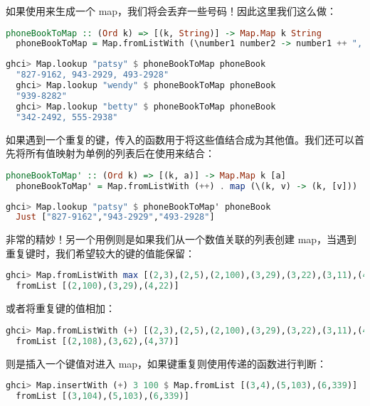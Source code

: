 \documentclass[./main.tex]{subfiles}
\begin{document}
如果使用来生成一个 map，我们将会丢弃一些号码！因此这里我们这么做：

\begin{lstlisting}[language=Haskell]
  phoneBookToMap :: (Ord k) => [(k, String)] -> Map.Map k String
  phoneBookToMap = Map.fromListWith (\number1 number2 -> number1 ++ ", " ++ number2)
\end{lstlisting}

\begin{lstlisting}[language=Haskell]
  ghci> Map.lookup "patsy" $ phoneBookToMap phoneBook
  "827-9162, 943-2929, 493-2928"
  ghci> Map.lookup "wendy" $ phoneBookToMap phoneBook
  "939-8282"
  ghci> Map.lookup "betty" $ phoneBookToMap phoneBook
  "342-2492, 555-2938"
\end{lstlisting}

如果遇到一个重复的键，传入的函数用于将这些值结合成为其他值。我们还可以首先将所有值映射为单例的列表后在使用\acode{++}来结合：

\begin{lstlisting}[language=Haskell]
  phoneBookToMap' :: (Ord k) => [(k, a)] -> Map.Map k [a]
  phoneBookToMap' = Map.fromListWith (++) . map (\(k, v) -> (k, [v]))
\end{lstlisting}

\begin{lstlisting}[language=Haskell]
  ghci> Map.lookup "patsy" $ phoneBookToMap' phoneBook
  Just ["827-9162","943-2929","493-2928"]
\end{lstlisting}

非常的精妙！另一个用例则是如果我们从一个数值关联的列表创建 map，当遇到重复键时，我们希望较大的键的值能保留：

\begin{lstlisting}[language=Haskell]
  ghci> Map.fromListWith max [(2,3),(2,5),(2,100),(3,29),(3,22),(3,11),(4,22),(4,15)]
  fromList [(2,100),(3,29),(4,22)]
\end{lstlisting}

或者将重复键的值相加：

\begin{lstlisting}[language=Haskell]
  ghci> Map.fromListWith (+) [(2,3),(2,5),(2,100),(3,29),(3,22),(3,11),(4,22),(4,15)]
  fromList [(2,108),(3,62),(4,37)]
\end{lstlisting}

则是插入一个键值对进入 map，如果键重复则使用传递的函数进行判断：

\begin{lstlisting}[language=Haskell]
  ghci> Map.insertWith (+) 3 100 $ Map.fromList [(3,4),(5,103),(6,339)]
  fromList [(3,104),(5,103),(6,339)]
\end{lstlisting}
\end{document}
